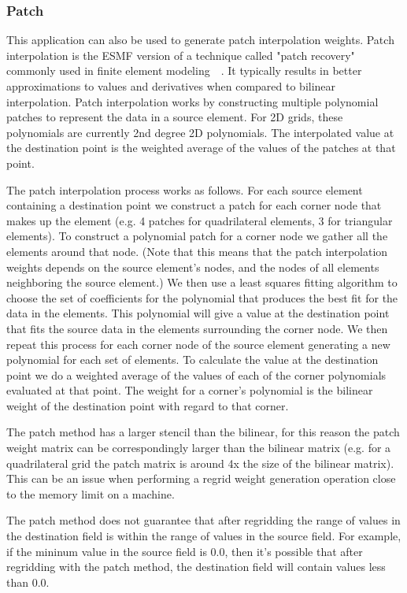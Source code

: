 \subsubsection{Patch}\label{sec:rwg_patch}
This application can also be used to generate patch interpolation weights. Patch
interpolation is the ESMF version of a technique called "patch recovery" commonly
used in finite element modeling~\cite{PatchInterp1}~\cite{PatchInterp2}. It typically results in better approximations to values and derivatives when compared to bilinear interpolation.
Patch interpolation works by constructing multiple polynomial patches to represent
the data in a source element. For 2D grids, these polynomials
are currently 2nd degree 2D polynomials. The interpolated value at the destination point
  is the weighted average of the values of the patches at that point.

The patch interpolation process works as follows.
For each source element containing a destination point
we construct a patch for each corner node that makes up the element (e.g. 4 patches for
quadrilateral elements, 3 for triangular elements). To construct a polynomial patch for
a corner node we gather all the elements around that node.
(Note that this means that the patch interpolation weights depends on the source
element's nodes, and the nodes of all elements neighboring the source element.)
We then use a least squares fitting algorithm to choose the set of coefficients
for the polynomial that produces the best fit for the data in the elements.
This polynomial will give a value at the destination point that fits the source data
in the elements surrounding the corner node. We then repeat this process for each
corner node of the source element generating a new polynomial for each set of elements.
To calculate the value at the destination point we do a weighted average of the values
of each of the corner polynomials evaluated at that point. The weight for a corner's
polynomial is the bilinear weight of the destination point with regard to that corner.

The patch method has a larger stencil than the bilinear, for this reason the patch weight matrix can be correspondingly larger
than the bilinear matrix (e.g. for a quadrilateral grid the patch matrix is around 4x the size of
 the bilinear matrix). This can be an issue when performing a regrid weight generation operation close to the memory
limit on a machine. 

The patch method does not guarantee that after regridding the range of values in the destination field is within the range of 
values in the source field. For example, if the mininum value in the source field is 0.0, then it's possible that after regridding with the 
patch method, the destination field will contain values less than 0.0.

